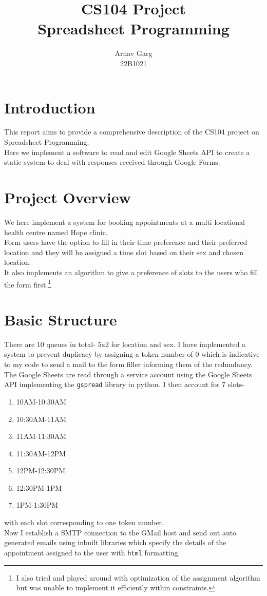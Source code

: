 \documentclass{article}
\title{CS104 Project \\ Spreadsheet Programming}
\author{Arnav Garg\\22B1021}
\date{}
\begin{document}
\maketitle
\tableofcontents
\clearpage

\section{Introduction}
This report aims to provide a comprehensive description of the CS104 project on Spreadsheet Programming.\\
Here we implement a software to read and edit Google Sheets API to create a static system to deal with responses received through Google Forms.
\section{Project Overview}
We here implement a system for booking appointments at a multi locational health centre named Hope clinic. \\Form users have the option to fill in their time preference and their preferred location and they will be assigned a time slot based on their sex and chosen location. \\It also implements an algorithm to give a preference of slots to the users who fill the form first.\footnote{I also tried and played around with optimization of the assignment algorithm but was unable to implement it efficiently within constraints.}
\section{Basic Structure}
There are 10 queues in total- 5x2 for location and sex. I have implemented a system to prevent duplicacy by assigning a token number of 0 which is indicative to my code to send a mail to the form filler informing them of the redundancy.
The Google Sheets are read through a service account using the Google Sheets API\autocite{1} implementing the \texttt{gspread}\autocite{4} library in python.
I then account for 7 slots-
\begin{enumerate}
    \item 10AM-10:30AM
    \item 10:30AM-11AM
    \item 11AM-11:30AM
    \item 11:30AM-12PM
    \item 12PM-12:30PM
    \item 12:30PM-1PM
    \item 1PM-1:30PM
\end{enumerate}
with each slot corresponding to one token number.\\
Now I establish a SMTP connection to the GMail host \autocite{2} and send out auto generated emails using inbuilt libraries which specify the details of the appointment assigned to the user with \texttt{html} formatting.
\end{document}
